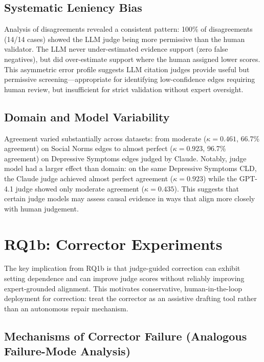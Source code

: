 \subsection{Systematic Leniency Bias}
Analysis of disagreements revealed a consistent pattern: 100\% of disagreements (14/14 cases) showed the LLM judge being more permissive than the human validator. The LLM never under-estimated evidence support (zero false negatives), but did over-estimate support where the human assigned lower scores. This asymmetric error profile suggests LLM citation judges provide useful but permissive screening---appropriate for identifying low-confidence edges requiring human review, but insufficient for strict validation without expert oversight.

\subsection{Domain and Model Variability}
Agreement varied substantially across datasets: from moderate ($\kappa = 0.461$, 66.7\% agreement) on Social Norms edges to almost perfect ($\kappa = 0.923$, 96.7\% agreement) on Depressive Symptoms edges judged by Claude. Notably, judge model had a larger effect than domain: on the same Depressive Symptoms CLD, the Claude judge achieved almost perfect agreement ($\kappa = 0.923$) while the GPT-4.1 judge showed only moderate agreement ($\kappa = 0.435$). This suggests that certain judge models may assess causal evidence in ways that align more closely with human judgement.

\section{RQ1b: Corrector Experiments}
\label{sec:discussion_rq1b}
The key implication from RQ1b is that judge-guided correction can exhibit setting dependence and can improve judge scores without reliably improving expert-grounded alignment. This motivates conservative, human-in-the-loop deployment for correction: treat the corrector as an assistive drafting tool rather than an autonomous repair mechanism.

\subsection{Mechanisms of Corrector Failure (Analogous Failure-Mode Analysis)}
\label{sec:discussion_corrector_failure_mechanisms}

